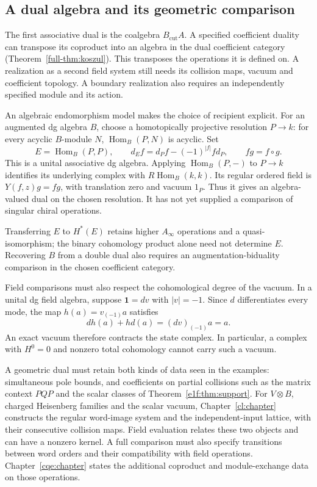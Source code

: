 \subsection{A dual algebra and its geometric comparison}

The first associative dual is the coalgebra
\(B_{\mathrm{cut}}A\). A specified coefficient duality
can transpose its coproduct into an algebra in the
dual coefficient category
(Theorem~\ref{full-thm:koszul}). This transposes the
operations it is defined on. A realization as a
second field system still needs its collision maps,
vacuum and coefficient topology.
A boundary realization also requires an independently
specified module and its action.

An\label{e1f:def:derived-endomorphism-field} algebraic endomorphism model makes the choice of
recipient explicit. For an augmented dg algebra
\(B\), choose a homotopically projective resolution
\(P\to k\): for every acyclic \(B\)-module \(N\),
\(\operatorname{Hom}_B(P,N)\) is acyclic. Set
\[
 E=\operatorname{Hom}_B(P,P),\qquad
 d_Ef=d_Pf-(-1)^{|f|}fd_P,\qquad fg=f\circ g.
\]
This is a unital associative dg algebra.
Applying \(\operatorname{Hom}_B(P,-)\) to \(P\to k\)
identifies its underlying complex with
\(R\operatorname{Hom}_B(k,k)\). Its regular ordered
field is \(Y(f,z)g=fg\), with translation zero and
vacuum \(1_P\). Thus it gives an algebra-valued dual
on the chosen resolution. It has not yet supplied
a comparison of singular chiral operations.

Transferring \(E\) to \(H^*(E)\) retains higher
\(A_\infty\) operations and a quasi-isomorphism;
the binary cohomology product alone need not determine
\(E\). Recovering \(B\) from a double dual also requires
an augmentation-biduality comparison in the chosen
coefficient category.

Field\label{e1f:def:exact-vacuum-contraction} comparisons must also respect the cohomological
degree of the vacuum. In a unital dg field algebra,
suppose \(\mathbf1=dv\) with \(|v|=-1\). Since
\(d\) differentiates every mode, the map
\(h(a)=v_{(-1)}a\) satisfies
\[
 dh(a)+hd(a)=(dv)_{(-1)}a=a.
\]
An exact vacuum therefore contracts the state complex.
In particular, a complex with \(H^0=0\) and nonzero
total cohomology cannot carry such a vacuum.

A geometric dual must retain both kinds of data seen
in the examples: simultaneous pole bounds, and
coefficients on partial collisions such as the
matrix context \(PQP\) and the scalar classes of
Theorem~\ref{e1f:thm:support}. For \(V\otimes B\),
charged Heisenberg families and the scalar vacuum,
Chapter~\ref{cl:chapter} constructs the regular
word-image system and the independent-input lattice,
with their consecutive collision maps. Field
evaluation relates these two objects and can have
a nonzero kernel. A full comparison must also
specify transitions between word orders and their
compatibility with field operations. Chapter~\ref{cqe:chapter}
states the additional coproduct and module-exchange
data on those operations.
